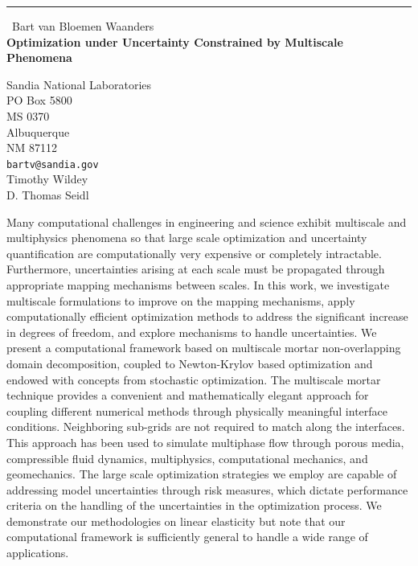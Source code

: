 \documentclass{report}
\begin{document}
\begin{center}
\rule{6in}{1pt} \
{\large Bart van Bloemen Waanders \\
{\bf Optimization under Uncertainty Constrained by Multiscale Phenomena}}

Sandia National Laboratories \\ PO Box 5800 \\ MS 0370 \\ Albuquerque \\ NM 87112
\\
{\tt bartv@sandia.gov}\\
Timothy Wildey\\
D. Thomas Seidl\end{center}

Many computational challenges in engineering and science exhibit
multiscale and multiphysics phenomena so that large scale optimization
and uncertainty quantification are computationally very expensive or
completely intractable. Furthermore, uncertainties arising at each scale
must be propagated through appropriate mapping mechanisms between scales.
In this work, we investigate multiscale formulations to improve on the
mapping mechanisms, apply computationally efficient optimization methods
to address the significant increase in degrees of freedom, and explore
mechanisms to handle uncertainties. We present a computational framework
based on multiscale mortar non-overlapping domain decomposition, coupled
to Newton-Krylov based optimization and endowed with concepts from
stochastic optimization. The multiscale mortar technique provides a
convenient and mathematically elegant approach for coupling different
numerical methods through physically meaningful interface conditions.
Neighboring sub-grids are not required to match along the interfaces.
This approach has been used to simulate multiphase flow through porous
media, compressible fluid dynamics, multiphysics, computational
mechanics, and geomechanics. The large scale optimization strategies we
employ are capable of addressing model uncertainties through risk
measures, which dictate performance criteria on the handling of the
uncertainties in the optimization process. We demonstrate our
methodologies on linear elasticity but note that our computational
framework is sufficiently general to handle a wide range of applications.
\end{document}

